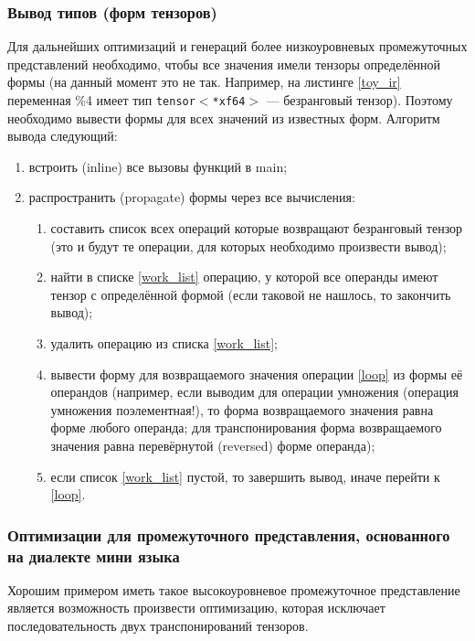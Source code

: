 \subsubsection{Вывод типов (форм тензоров)}

Для дальнейших оптимизаций и генераций более низкоуровневых промежуточных представлений необходимо, чтобы все значения имели тензоры определённой формы (на данный момент это не так. Например, на листинге \ref{toy_ir} переменная \%4 имеет тип \texttt{tensor$<$*xf64$>$} --- безранговый тензор). Поэтому необходимо вывести формы для всех значений из известных форм.
Алгоритм вывода следующий:

\begin{enumerate}
	\item встроить (inline) все вызовы функций в main;
	\item распространить (propagate) формы через все вычисления:
	      \begin{enumerate}
		      \item \label{work_list}составить список всех операций которые возвращают безранговый тензор (это и будут те операции, для которых необходимо произвести вывод);
		      \item \label{loop} найти в списке \ref{work_list} операцию, у которой все операнды имеют тензор с определённой формой (если таковой не нашлось, то закончить вывод);
		      \item удалить операцию из списка \ref{work_list};
		      \item вывести форму для возвращаемого значения операции \ref{loop} из формы её операндов (например, если выводим для операции умножения (операция умножения поэлементная!), то форма возвращаемого значения равна форме любого операнда; для транспонирования форма возвращаемого значения равна перевёрнутой (reversed) форме операнда);
		      \item если список \ref{work_list} пустой, то завершить вывод, иначе перейти к \ref{loop}.
	      \end{enumerate}
\end{enumerate}

\subsubsection{Оптимизации для промежуточного представления, основанного на диалекте мини языка}

Хорошим примером иметь такое высокоуровневое промежуточное представление является возможность произвести оптимизацию, которая исключает последовательность двух транспонирований тензоров.

